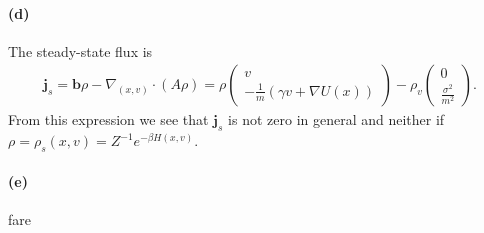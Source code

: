 \documentclass[a4paper,11pt]{article}
\theoremstyle{definition}
\theoremstyle{plain}
\theoremstyle{remark}
\begin{document}
\paragraph*{(d)}

The steady-state flux is 
\begin{align*}
\mathbf{j}_s = \mathbf{b}\rho - \nabla_{(x,v)}\cdot(A\rho) = \rho\left(\begin{matrix}
v \\ -\frac{1}{m}(\gamma v + \nabla U(x))
\end{matrix}\right) - \rho_v\left(\begin{matrix}
0 \\ \frac{\sigma^2}{m^2}
\end{matrix}\right).
\end{align*}
From this expression we see that $\mathbf{j}_s$ is not zero in general and neither if $\rho = \rho_s(x,v) = Z^{-1}e^{-\beta H(x,v)}$.

\paragraph*{(e)} fare
\end{document}
